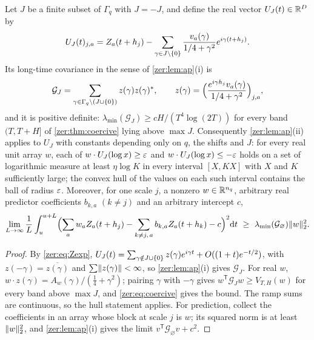 \begin{corollary}\label{zer:cor:multiscale}
Let $J$ be a finite subset of $\Gamma_q$ with $J=-J$, and define the real vector
$U_J(t)\in\mathbb{R}^D$ by
\[
 U_J(t)_{j,a}=Z_a(t+h_j)-\sum_{\gamma\in J\setminus\{0\}}\frac{v_a(\gamma)}{1/4+\gamma^2}e^{i\gamma(t+h_j)} .
\]
Its long-time covariance in the sense of \cref{zer:lem:ap}\textup{(i)} is
\[
 \mathcal G_J=\sum_{\gamma\in\Gamma_q\setminus(J\cup\{0\})}z(\gamma)z(\gamma)^*,\qquad
 z(\gamma)=\Bigl(\frac{e^{i\gamma h_j}v_a(\gamma)}{1/4+\gamma^2}\Bigr)_{j,a},
\]
and it is positive definite: $\lambda_{\min}(\mathcal G_J)\ge cH/(T^4\log(2T))$ for every band
$(T,T+H]$ of \cref{zer:thm:coercive} lying above $\max J$. Consequently
\cref{zer:lem:ap}\textup{(ii)} applies to $U_J$ with constants depending only on $q$, the
shifts and $J$: for every real unit array $w$, each of $w\cdot U_J(\log x)\ge\varepsilon$ and
$w\cdot U_J(\log x)\le-\varepsilon$ holds on a set of logarithmic measure at least $\eta\log K$ in
every interval $[X,KX]$ with $X$ and $K$ sufficiently large; the convex hull of the values on
each such interval contains the ball of radius $\varepsilon$. Moreover, for one scale $j$, a nonzero
$w\in\mathbb{R}^{n_q}$, arbitrary real predictor coefficients $b_{k,a}$ $(k\ne j)$ and an arbitrary
intercept $c$,
\[
 \lim_{L\to\infty}\frac1L\int_u^{u+L}\Bigl(\sum_aw_aZ_a(t+h_j)-\sum_{k\ne j,\,a}b_{k,a}Z_a(t+h_k)-c\Bigr)^2\mathrm{d} t
 \ \ge\ \lambda_{\min}(\mathcal G_\varnothing)\lVert w\rVert_2^2 .
\]
\end{corollary}
\begin{proof}
By \eqref{zer:eq:Zexp}, $U_J(t)=\sum_{\gamma\notin J\cup\{0\}}z(\gamma)e^{i\gamma t}+O((1+t)e^{-t/2})$,
with $z(-\gamma)=\overline{z(\gamma)}$ and $\sum\lVert z(\gamma)\rVert<\infty$, so \cref{zer:lem:ap}(i)
gives $\mathcal G_J$. For real $w$, $w\cdot z(\gamma)=A_w(\gamma)/(\tfrac14+\gamma^2)$; pairing $\gamma$
with $-\gamma$ gives $w^{\mathsf T}\mathcal G_Jw\ge V_{T,H}(w)$ for every band above $\max J$, and
\eqref{zer:eq:coercive} gives the bound. The ramp sums are continuous, so the hull statement
applies. For prediction, collect the coefficients in an array whose block at scale $j$ is
$w$; its squared norm is at least $\lVert w\rVert_2^2$, and \cref{zer:lem:ap}(i) gives the limit
$v^{\mathsf T}\mathcal G_\varnothing v+c^2$.
\end{proof}

